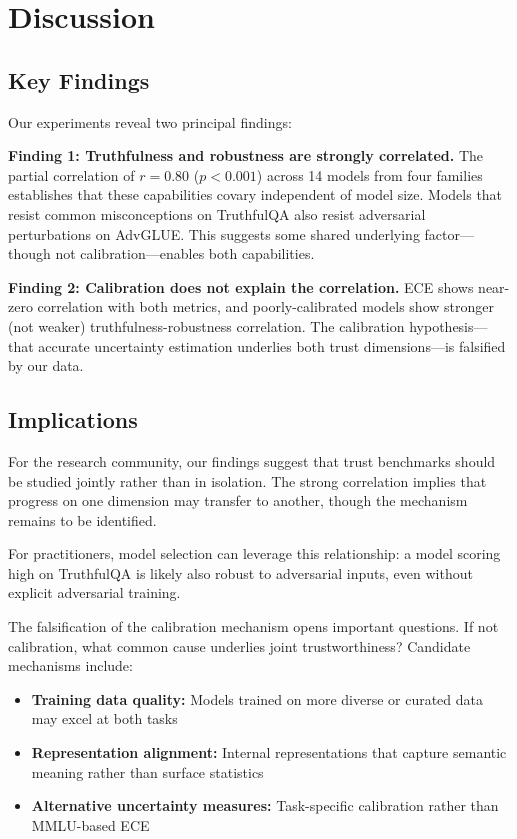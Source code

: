 \section{Discussion}
\label{sec:discussion}

\subsection{Key Findings}

Our experiments reveal two principal findings:

\textbf{Finding 1: Truthfulness and robustness are strongly correlated.} The partial correlation of $r=0.80$ ($p<0.001$) across 14 models from four families establishes that these capabilities covary independent of model size. Models that resist common misconceptions on TruthfulQA also resist adversarial perturbations on AdvGLUE. This suggests some shared underlying factor---though not calibration---enables both capabilities.

\textbf{Finding 2: Calibration does not explain the correlation.} ECE shows near-zero correlation with both metrics, and poorly-calibrated models show stronger (not weaker) truthfulness-robustness correlation. The calibration hypothesis---that accurate uncertainty estimation underlies both trust dimensions---is falsified by our data.

\subsection{Implications}

For the research community, our findings suggest that trust benchmarks should be studied jointly rather than in isolation. The strong correlation implies that progress on one dimension may transfer to another, though the mechanism remains to be identified.

For practitioners, model selection can leverage this relationship: a model scoring high on TruthfulQA is likely also robust to adversarial inputs, even without explicit adversarial training.

The falsification of the calibration mechanism opens important questions. If not calibration, what common cause underlies joint trustworthiness? Candidate mechanisms include:
\begin{itemize}
    \item \textbf{Training data quality:} Models trained on more diverse or curated data may excel at both tasks
    \item \textbf{Representation alignment:} Internal representations that capture semantic meaning rather than surface statistics
    \item \textbf{Alternative uncertainty measures:} Task-specific calibration rather than MMLU-based ECE
\end{itemize}

